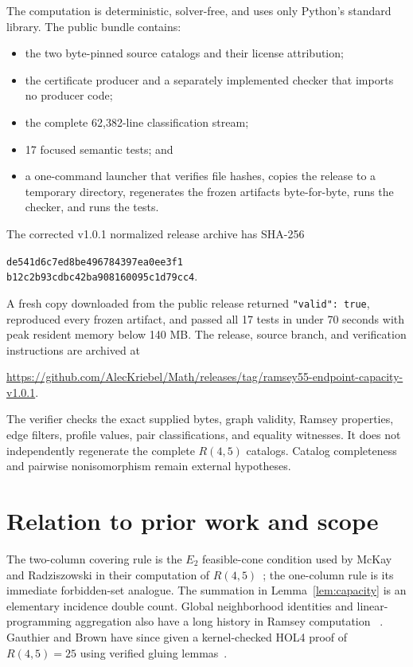 \documentclass[11pt]{article}
\begin{document}
The computation is deterministic, solver-free, and uses only Python's
standard library.  The public bundle contains:
\begin{itemize}
\item the two byte-pinned source catalogs and their license attribution;
\item the certificate producer and a separately implemented checker that
imports no producer code;
\item the complete 62,382-line classification stream;
\item 17 focused semantic tests; and
\item a one-command launcher that verifies file hashes, copies the release to
a temporary directory, regenerates the frozen artifacts byte-for-byte, runs
the checker, and runs the tests.
\end{itemize}

The corrected v1.0.1 normalized release archive has SHA-256
\begin{center}
\texttt{de541d6c7ed8be496784397ea0ee3f1}\\[-2pt]
\texttt{b12c2b93cdbc42ba908160095c1d79cc4}.
\end{center}
A fresh copy downloaded from the public release returned
\texttt{"valid": true}, reproduced every frozen artifact, and passed all 17
tests in under 70 seconds with peak resident memory below 140 MB.  The release,
source branch, and verification instructions are archived at
\begin{center}
\url{https://github.com/AlecKriebel/Math/releases/tag/ramsey55-endpoint-capacity-v1.0.1}.
\end{center}

The verifier checks the exact supplied bytes, graph validity, Ramsey
properties, edge filters, profile values, pair classifications, and equality
witnesses.  It does not independently regenerate the complete
$R(4,5)$ catalogs.  Catalog completeness and pairwise nonisomorphism remain
external hypotheses.

\section{Relation to prior work and scope}

The two-column covering rule is the $E_2$ feasible-cone condition used by
McKay and Radziszowski in their computation of
$R(4,5)$~\cite{mckay-radziszowski-r45}; the one-column rule is its immediate
forbidden-set analogue.  The summation in Lemma~\ref{lem:capacity} is an
elementary incidence double count.  Global
neighborhood identities and linear-programming aggregation also have a long
history in Ramsey computation
~\cite{mckay-radziszowski-lp,mckay-radziszowski-counting}.
Gauthier and Brown have since given a kernel-checked HOL4 proof of
$R(4,5)=25$ using verified gluing lemmas~\cite{gauthier-brown}.
\end{document}
